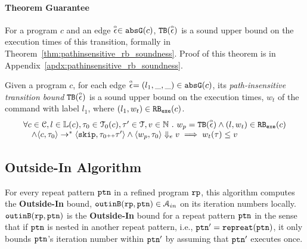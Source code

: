 \paragraph{Theorem Guarantee}
For a program $c$ and an edge $\stackrel{\scriptscriptstyle{\alpha}}{\mathtt{\epsilon}{}} \in \mathtt{abs}{\mathtt{G}}(c)$,
${\mathtt{TB}}(\stackrel{\scriptscriptstyle{\alpha}}{\mathtt{\epsilon}{}})$ is a sound upper bound
on the execution times of this transition,
formally in Theorem~\ref{thm:pathinsensitive_rb_soundness}. 
Proof of this theorem is in Appendix~\ref{apdx:pathinsensitive_rb_soundness}.
%
\begin{thm}
  \label{thm:pathinsensitive_rb_soundness}
Given a program ${c}$, for each edge $\stackrel{\scriptscriptstyle{\alpha}}{\mathtt{\epsilon}{}} = (l_1, \_, \_) \in \mathtt{abs}{\mathtt{G}}(c)$,
its \emph{path-insensitive transition bound} ${\mathtt{TB}}(\stackrel{\scriptscriptstyle{\alpha}}{\mathtt{\epsilon}{}})$ 
 is a sound upper bound on 
the execution times, $w_t$ of the command with label $l_1$,
where $(l_1, w_t) \in \mathtt{RB_{exe}}(c)$.
  \[
    \begin{array}{l}
      \forall c \in \mathcal{C}, l \in \mathbb{L}(c),\mathtt{\tau}_0 \in \mathcal{T}_0(c), 
      \mathtt{\tau}' \in \mathcal{T}, v \in \mathbb{N}
       ~.~ 
      w_p = {\mathtt{TB}}(\stackrel{\scriptscriptstyle{\alpha}}{\mathtt{\epsilon}{}})
      \land 
      (l, w_t) \in \mathtt{RB_{exe}}(c)
      \\ \quad
      \land \langle {c}, \mathtt{\tau}_0 \rangle \to^{*} \langle \mathtt{skip}, \mathtt{\tau}_0{\scriptscriptstyle ++}\mathtt{\tau}' \rangle 
      \land 
      \langle w_{p}, \mathtt{\tau}_0 \rangle \Downarrow_e v
      \implies
      w_{t}(\mathtt{\tau}) \leq v
    \end{array}
    \]
\end{thm}

\subsection{Outside-In Algorithm}
\label{sec:pathsensitive_rb-outinalg}
%
For every repeat pattern $\mathtt{ptn}$ in a refined program $\mathtt{rp}$, 
this algorithm
computes the \textbf{Outside-In} bound, $\mathtt{outinB}(\mathtt{rp}, \mathtt{ptn}) \in \mathcal{A}_{in}$ on its iteration numbers locally.
\\
$\mathtt{outinB}(\mathtt{rp}, \mathtt{ptn})$ is the \textbf{Outside-In} bound for a repeat pattern $\mathtt{ptn}$ in the sense that
if $\mathtt{ptn}$ is nested
in another repeat pattern, i.e., $\mathtt{ptn}' = \mathtt{repreat}(\mathtt{ptn})$,
it only bounds $\mathtt{ptn}$'s iteration number within $\mathtt{ptn}'$ by assuming that $\mathtt{ptn}'$ executes once.

